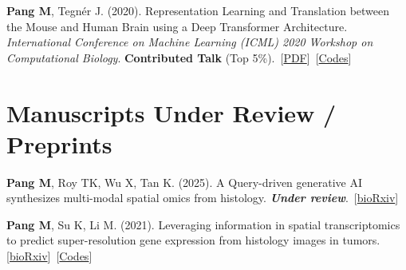 \documentclass[11pt, letterpaper]{article}
\newcommand{\me}[1]{\textbf{#1}}
\newcommand{\papertag}[2]{\,[\href{#2}{\textcolor{linkblue}{#1}}]}
\begin{document}
\begin{enumerate}[leftmargin=1.5em, itemsep=6pt, label={[\arabic*]}, resume]

\item \me{Pang M}, Tegn\'er J. (2020). Representation Learning and Translation between the Mouse and Human Brain using a Deep Transformer Architecture. \textit{International Conference on Machine Learning (ICML) 2020 Workshop on Computational Biology}. \textbf{Contributed Talk} (Top 5\%).
\papertag{PDF}{https://icml-compbio.github.io/icml-website-2020/2020/papers/WCBICML2020_paper_29.pdf}
\papertag{Codes}{https://github.com/maxpmx/scTT-pytorch}

\end{enumerate}

\section{Manuscripts Under Review / Preprints}

\begin{enumerate}[leftmargin=1.5em, itemsep=6pt, label={[\arabic*]}, resume]

\item
\me{Pang M}, Roy TK, Wu X, Tan K. (2025). A Query-driven generative AI synthesizes multi-modal spatial omics from histology. \textbf{\textit{Under review}}.
\papertag{bioRxiv}{https://www.biorxiv.org/content/10.64898/2025.12.11.693669v1}

\item \me{Pang M}, Su K, Li M. (2021). Leveraging information in spatial transcriptomics to predict super-resolution gene expression from histology images in tumors.
\papertag{bioRxiv}{https://www.biorxiv.org/content/10.1101/2021.02.28.433265}
\papertag{Codes}{https://github.com/maxpmx/HisToGene}


\end{enumerate}
\end{document}
